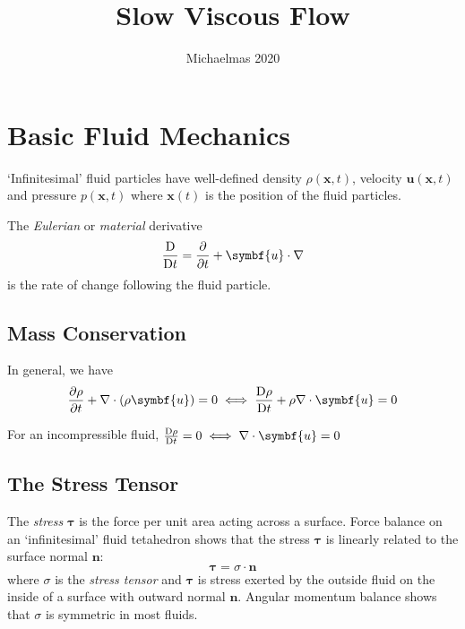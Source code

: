 \documentclass{jknotes}
\begin{document}
\title{Slow Viscous Flow}
\date{Michaelmas 2020}

\maketitle
\suggestionsspiel
\tableofcontents

\section{Basic Fluid Mechanics}
`Infinitesimal' fluid particles have well-defined density $\rho(\symbf{x},t)$,
velocity $\symbf{u}(\symbf{x},t)$ and pressure $p(\symbf{x},t)$ where $\symbf{x}(t)$ is
the position of the fluid particles.

\begin{defn}
	The \emph{Eulerian} or \emph{material} derivative
	\begin{equation}
		\frac{\diffD}{\diffD{t}} = \frac{\partial}{\partial t} + \symbf{u}\cdot
		\nabla
	\end{equation}
	is the rate of change following the fluid particle.
\end{defn}

\subsection{Mass Conservation}
In general, we have
\begin{equation}
\frac{\partial \rho}{\partial t} + \nabla \cdot \left(\rho \symbf{u}\right) = 0
\iff \frac{\diffD{\rho}}{\diffD{t}} + \rho \nabla \cdot \symbf{u} = 0
\end{equation}

For an incompressible fluid, $\frac{\diffD{\rho}}{\diffD{t}} = 0 \iff \nabla
\cdot \symbf{u} = 0$

\subsection{The Stress Tensor}
The \emph{stress} $\symbf{\tau}$ is the force per unit area acting across a
surface. Force balance on an `infinitesimal' fluid tetahedron shows that the
stress $\symbf{\tau}$ is linearly related to the surface normal $\symbf{n}$:
\begin{equation}
	\symbf{\tau} = \sigma \cdot \symbf{n}
\end{equation}
where $\sigma$ is the \emph{stress tensor} and $\symbf{\tau}$ is stress exerted
by the outside fluid on the inside of a surface with outward normal $\symbf{n}$.
Angular momentum balance shows that $\sigma$ is symmetric in most fluids.
\end{document}
